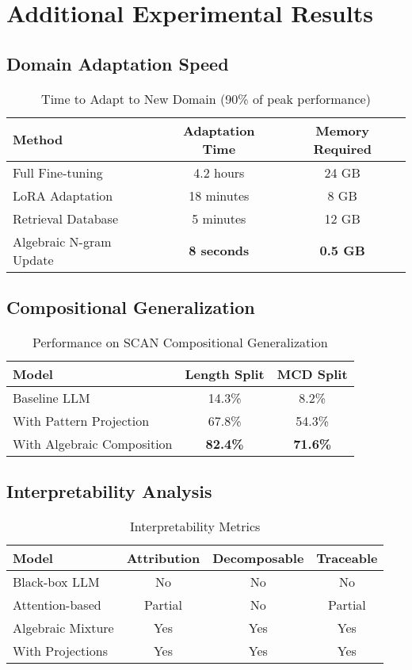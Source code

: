 \documentclass{article}
\theoremstyle{definition}
\begin{document}
\section{Additional Experimental Results}

\subsection{Domain Adaptation Speed}

\begin{table}[h]
\centering
\caption{Time to Adapt to New Domain (90\% of peak performance)}
\begin{tabular}{lcc}
\toprule
Method & Adaptation Time & Memory Required \\
\midrule
Full Fine-tuning & 4.2 hours & 24 GB \\
LoRA Adaptation & 18 minutes & 8 GB \\
Retrieval Database & 5 minutes & 12 GB \\
Algebraic N-gram Update & \textbf{8 seconds} & \textbf{0.5 GB} \\
\bottomrule
\end{tabular}
\end{table}

\subsection{Compositional Generalization}

\begin{table}[h]
\centering
\caption{Performance on SCAN Compositional Generalization}
\begin{tabular}{lcc}
\toprule
Model & Length Split & MCD Split \\
\midrule
Baseline LLM & 14.3\% & 8.2\% \\
With Pattern Projection & 67.8\% & 54.3\% \\
With Algebraic Composition & \textbf{82.4\%} & \textbf{71.6\%} \\
\bottomrule
\end{tabular}
\end{table}

\subsection{Interpretability Analysis}

\begin{table}[h]
\centering
\caption{Interpretability Metrics}
\begin{tabular}{lccc}
\toprule
Model & Attribution & Decomposable & Traceable \\
\midrule
Black-box LLM & No & No & No \\
Attention-based & Partial & No & Partial \\
Algebraic Mixture & Yes & Yes & Yes \\
With Projections & Yes & Yes & Yes \\
\bottomrule
\end{tabular}
\end{table}
\end{document}
